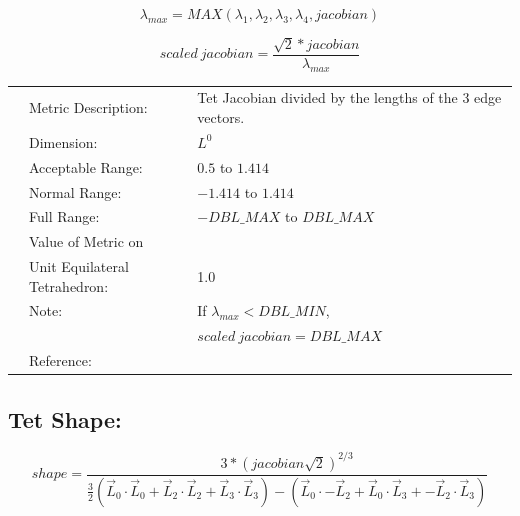 \documentclass[12pt]{article}
\begin{document}
\begin{displaymath}
              \lambda_{max} = MAX \left( \lambda_1, \lambda_2, \lambda_3, \lambda_4, jacobian \right) 
\end{displaymath}

\begin{displaymath}
            scaled~jacobian = \frac {\sqrt{2} * jacobian } 
                                     { \lambda_{max} }
\end{displaymath}


\begin{tabular}{lll}
& Metric Description:  & Tet Jacobian divided by the lengths of the 3 edge vectors. \\
& Dimension:           & $L^0$  \\ 
& Acceptable Range:    & $0.5$ to $1.414$ \\ 
& Normal Range:        & $-1.414$ to $1.414$\\ 
& Full Range:          & $-DBL\_MAX$ to $DBL\_MAX$\\ 
& Value of Metric on   &  \\
& Unit Equilateral Tetrahedron:    & 1.0 \\ 
& Note:                & If $ \lambda_{max} < DBL\_MIN$,  \\
&                      & $scaled~jacobian = DBL\_MAX$ \\
& Reference:           & \cite{two} \\
\end{tabular} 


\subsection*{Tet Shape:}

\begin{displaymath}
shape =  \frac{ 3 * \left( jacobian \sqrt{2} \right)^{2/3} } 
              { \frac {3}{2} \left( 
                      \vec L_0 \cdot  \vec L_0 +
                      \vec L_2 \cdot  \vec L_2 +
                      \vec L_3 \cdot  \vec L_3  \right) - 
               \left( \vec L_0 \cdot -\vec L_2 +
                      \vec L_0 \cdot  \vec L_3 +
                     -\vec L_2 \cdot  \vec L_3 \right) } 
\end{displaymath}
\end{document}
